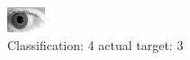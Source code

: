 \begin{figure}[h!]
\begin{center}
\includegraphics[width=0.60\columnwidth]{figures/ID278_class_4_target_3.png}
\end{center}
\caption{ Classification: 4 actual target: 3}
\label{fig:ID278_class_4_target_3}
\end{figure}
